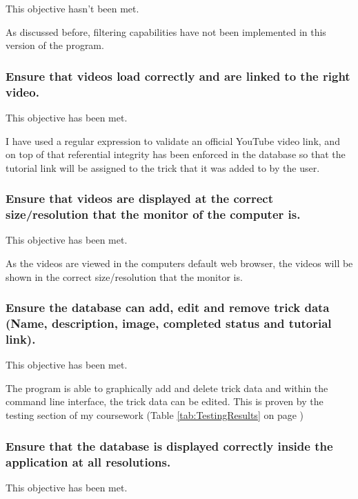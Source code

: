 This objective hasn't been met.

As discussed before, filtering capabilities have not been implemented in this version of the program.




\subsubsection {Ensure that videos load correctly and are linked to the right video.}

This objective has been met.

 I have used a regular expression to validate an official YouTube video link, and on top of that referential integrity has been enforced in the database so that the tutorial link will be assigned to the trick that it was added to by the user. 




\subsubsection {Ensure that videos are displayed at the correct size/resolution that the monitor of the computer is.}

This objective has been met.

As the videos are viewed in the computers default web browser, the videos will be shown in the correct size/resolution that the monitor is.



\subsubsection {Ensure the database can add, edit and remove trick data (Name, description, image, completed status and tutorial link).}

This objective has been met.

The program is able to graphically add and delete trick data and within the command line interface, the trick data can be edited. This is proven by the testing section of my coursework (Table \ref{tab:TestingResults} on page \pageref{tab:TestingResults})

\subsubsection {Ensure that the database is displayed correctly inside the application at all resolutions.}

This objective has been met.

